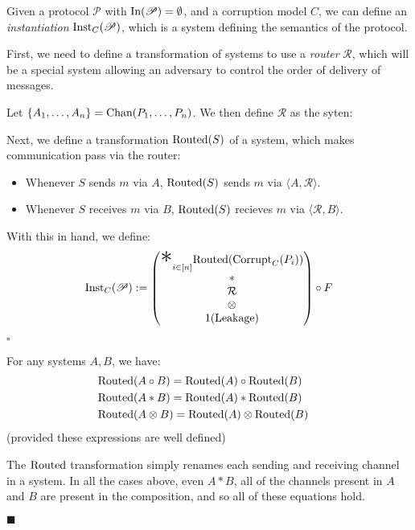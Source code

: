 \begin{definition}[Instantiation]
  Given a protocol $\mathscr{P}$ with $\text{In}(\mathscr{P}) = \emptyset$, and a corruption model $C$, we can
  define an \emph{instantiation} $\text{Inst}_C(\mathscr{P})$, which
  is a system defining the semantics of the protocol.

  First, we need to define a transformation of systems to use
  a \emph{router} $\mathcal{R}$, which will be a special system
  allowing an adversary to control the order of delivery of messages.

  Let $\{A_1, \ldots, A_n\} = \text{Chan}(P_1, \ldots, P_n)$.
  We then define $\mathcal{R}$ as the syten:

  Next, we define a transformation $\text{Routed}(S)$ of a system,
  which makes communication pass via the router:
  \begin{itemize}
    \item Whenever $S$ sends $m$ via $A$, $\text{Routed}(S)$ sends $m$ via $\langle A , \mathcal{R} \rangle$.
    \item Whenever $S$ receives $m$ via $B$, $\text{Routed}(S)$ recieves $m$ via $\langle \mathcal{R}, B \rangle$.
  \end{itemize}

With this in hand, we define:
$$
\tx{Inst}_C(\mathscr{P}) :=
  \begin{pmatrix}
    {\displaystyle \bigast}_{i \in [n]} \tx{Routed}(\tx{Corrupt}_C(P_i))\cr
    *\cr
    \mathcal{R}\cr
    \otimes\cr
    1(\tx{Leakage})
  \end{pmatrix}
  \circ F
$$


$\square$
\end{definition}

\begin{lemma}
  \label{thm:routed}
  For any systems $A, B$, we have:
$$
\begin{aligned}
  &\text{Routed}(A \circ B) = \text{Routed}(A) \circ \text{Routed}(B)\cr
  &\text{Routed}(A * B) = \text{Routed}(A) * \text{Routed}(B)\cr
  &\text{Routed}(A \otimes B) = \text{Routed}(A) \otimes \text{Routed}(B)\cr
\end{aligned}
$$
(provided these expressions are well defined)

 The $\text{Routed}$ transformation simply
renames each sending and receiving channel in a system.
In all the cases above, even $A * B$, all of the channels present
in $A$ and $B$ are present in the composition, and so all
of these equations hold.

$\blacksquare$
\end{lemma}


